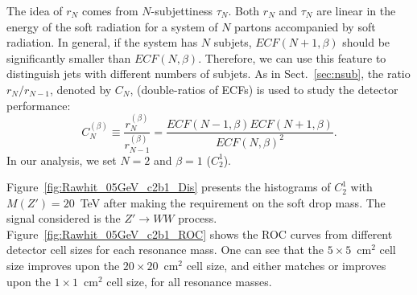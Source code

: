 The idea of $r_N$ comes from $N$-subjettiness $\tau_N$. Both $r_N$ and $\tau_N$ 
are linear in the energy of the soft radiation for a system of $N$ partons  accompanied 
by  soft radiation. In general, if the system has $N$ subjets, $ECF(N+1,\beta)$ 
should be significantly smaller than $ECF(N,\beta)$. Therefore, we can use this
 feature to distinguish jets with different numbers  of subjets. 
As in Sect.~\ref{sec:nsub}, the ratio $r_N/r_{N-1}$, denoted by $C_N$, 
(double-ratios of ECFs) is used to study the detector performance: 
\begin{equation}
C_{N}^{(\beta)}\equiv\frac{r_{N}^{(\beta)}}{r_{N-1}^{(\beta)}}=\frac{ECF(N-1,\beta)ECF(N+1,\beta)}{ECF(N,\beta)^2}.
\end{equation}
In our analysis, we set $N=2$ and $\beta=1$ ($C_2^1$).

Figure~\ref{fig:Rawhit_05GeV_c2b1_Dis} presents the histograms of $C_{2}^{1}$ 
with $M(Z')=20$~TeV after making the requirement on the soft drop mass. 
The signal considered is the $Z' \rightarrow WW$ process. 
Figure~\ref{fig:Rawhit_05GeV_c2b1_ROC} shows the ROC curves from different 
detector cell sizes for each resonance mass. One can see that 
the $5 \times 5$~$\mathrm{cm}^2$ cell size improves upon the $20 \times 20$~$\mathrm{cm}^2$ cell size, and either matches or improves upon the $1 \times 1$~$\mathrm{cm}^2$ cell size,
   for all resonance masses. 

